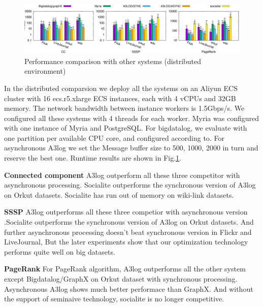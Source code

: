 \begin{figure}[!t]
	\vspace{1in}
	\centering
	\includegraphics[width=6.6in]{figuration/compare.eps}
	\vspace{-0.1in}
	\caption{Performance comparison with other systems (distributed environment)}
	\label{fig:dist-result}
\end{figure}
In the distributed comparsion we deploy all the systems on an Aliyun ECS cluster with
16 ecs.r5.xlarge ECS instances, each with 4 vCPUs and 32GB memory. The network bandwidth between instance workers is  1.5Gbps/s. We configured all these systems with 4 threads for each worker. Myria was configured with one instance of Myria and PostgreSQL. For bigdatalog, we evaluate with one partition per available CPU core, and configured according to\cite{Shkapsky:2016:BDA:2882903.2915229}. For asynchronous A3log we set the Message buffer size to 500, 1000, 2000 in turn and reserve the best one. Runtime results are shown in Fig.\ref{fig:dist-result}. 

\textbf{Connected component} A3log outperform all these three competitor with asynchronous processing. Socialite outperforms the synchronous version of A3log on Orkut datasets. Socialite has run out of memory on wiki-link datasets.

\textbf{SSSP} A3log outperforms all these three competior with asynchronous version .Socialite outperforms the synchronous version of A3log on Orkut datasets. And further asynchronous processing doesn't beat synchronous version in Flickr and LiveJournal, But the later experiments show that our optimization technology performs quite well on big datasets.

\textbf{PageRank}
For PageRank algorithm, A3log outperforms all the other system except Bigdatalog/GraphX on Orkut dataset with synchronous processing. Asynchronous A3log shows much better performace than GraphX. And without the support of seminaive technology, socialite is no longer competitive.


